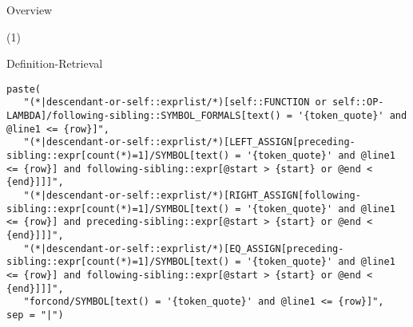 \appendix

\begin{frame}{Overview}
   \tableofcontents
\end{frame}

\begin{frame}[c,plain]{}
(1)%
\end{frame}


\begin{frame}[fragile]{Definition-Retrieval}
%
\begin{verbatim}
paste(
   "(*|descendant-or-self::exprlist/*)[self::FUNCTION or self::OP-LAMBDA]/following-sibling::SYMBOL_FORMALS[text() = '{token_quote}' and @line1 <= {row}]",
   "(*|descendant-or-self::exprlist/*)[LEFT_ASSIGN[preceding-sibling::expr[count(*)=1]/SYMBOL[text() = '{token_quote}' and @line1 <= {row}] and following-sibling::expr[@start > {start} or @end < {end}]]]",
   "(*|descendant-or-self::exprlist/*)[RIGHT_ASSIGN[following-sibling::expr[count(*)=1]/SYMBOL[text() = '{token_quote}' and @line1 <= {row}] and preceding-sibling::expr[@start > {start} or @end < {end}]]]",
   "(*|descendant-or-self::exprlist/*)[EQ_ASSIGN[preceding-sibling::expr[count(*)=1]/SYMBOL[text() = '{token_quote}' and @line1 <= {row}] and following-sibling::expr[@start > {start} or @end < {end}]]]",
   "forcond/SYMBOL[text() = '{token_quote}' and @line1 <= {row}]",
sep = "|")
\end{verbatim}
\end{frame}

